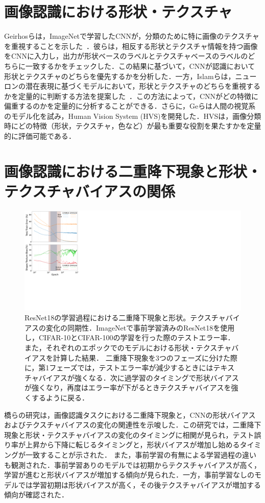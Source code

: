 \section{画像認識における形状・テクスチャ}
Geirhosらは，ImageNetで学習したCNNが，分類のために特に画像のテクスチャを重視することを示した~\cite{Geirhos}．彼らは，相反する形状とテクスチャ情報を持つ画像をCNNに入力し，出力が形状ベースのラベルとテクスチャベースのラベルのどちらに一致するかをチェックした．この結果に基づいて，CNNが認識において形状とテクスチャのどちらを優先するかを分析した．一方，Islamらは，ニューロンの潜在表現に基づくモデルにおいて，形状とテクスチャのどちらを重視するかを定量的に判断する方法を提案した~\cite{Islam}．この方法によって，CNNがどの特徴に偏重するのかを定量的に分析することができる．さらに，Geらは人間の視覚系のモデル化を試み，Human Vision System (HVS)を開発した．HVSは，画像分類時にどの特徴（形状，テクスチャ，色など）が最も重要な役割を果たすかを定量的に評価可能である\cite{Ge}．

\section{画像認識における二重降下現象と形状・テクスチャバイアスの関係}
\begin{figure}[t]
    \centering
    \includegraphics[width=\linewidth]{fig/iwaseICPR.pdf}
    \caption{ResNet18の学習過程における二重降下現象と形状。テクスチャバイアスの変化の同期性．ImageNetで事前学習済みのResNet18を使用し，CIFAR-10とCIFAR-100の学習を行った際のテストエラー率．また，それぞれのエポックでのモデルにおける形状・テクスチャバイアスを計算した結果．
    二重降下現象を3つのフェーズに分けた際に，第1フェーズでは，テストエラー率が減少するときにはテキスチャバイアスが強くなる．次に過学習のタイミングで形状バイアスが強くなり，再度はエラー率が下がるときテクスチャバイアスを強くするように戻る．}
    \label{fig:iwaseICPR}
\end{figure}
橋らの研究\cite{DD_STB}は，画像認識タスクにおける二重降下現象と，CNNの形状バイアスおよびテクスチャバイアスの変化の関連性を示唆した．この研究では，二重降下現象と形状・テクスチャバイアスの変化のタイミングに相関が見られ，テスト誤り率が上昇から下降に転じるタイミングと，形状バイアスが増加し始めるタイミングが一致することが示された．
また，事前学習の有無による学習過程の違いも観測された．事前学習ありのモデルでは初期からテクスチャバイアスが高く，学習が進むと形状バイアスが増加する傾向が見られた．一方，事前学習なしのモデルでは学習初期は形状バイアスが高く，その後テクスチャバイアスが増加する傾向が確認された．

